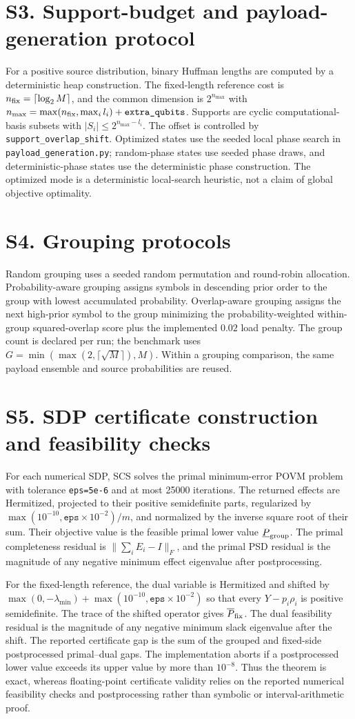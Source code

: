 \documentclass[10pt]{article}
\newcommand{\suppsection}[1]{\section*{#1}}
\begin{document}
\suppsection{S3. Support-budget and payload-generation protocol}
For a positive source distribution, binary Huffman lengths are computed by a deterministic heap construction. The fixed-length reference cost is $n_{\rm fix}=\lceil\log_2 M\rceil$, and the common dimension is $2^{n_{\max}}$ with $n_{\max}=\max(n_{\rm fix},\max_i l_i)+\texttt{extra\_qubits}$. Supports are cyclic computational-basis subsets with $|S_i|\le 2^{n_{\max}-l_i}$. The offset is controlled by \texttt{support\_overlap\_shift}. Optimized states use the seeded local phase search in \texttt{payload\_generation.py}; random-phase states use seeded phase draws, and deterministic-phase states use the deterministic phase construction. The optimized mode is a deterministic local-search heuristic, not a claim of global objective optimality.

\suppsection{S4. Grouping protocols}
Random grouping uses a seeded random permutation and round-robin allocation. Probability-aware grouping assigns symbols in descending prior order to the group with lowest accumulated probability. Overlap-aware grouping assigns the next high-prior symbol to the group minimizing the probability-weighted within-group squared-overlap score plus the implemented $0.02$ load penalty. The group count is declared per run; the benchmark uses $G=\min(\max(2,\lceil\sqrt M\rceil),M)$. Within a grouping comparison, the same payload ensemble and source probabilities are reused.

\suppsection{S5. SDP certificate construction and feasibility checks}
For each numerical SDP, SCS solves the primal minimum-error POVM problem with tolerance \texttt{eps=5e-6} and at most 25000 iterations. The returned effects are Hermitized, projected to their positive semidefinite parts, regularized by $\max(10^{-10},\texttt{eps}\times10^{-2})/m$, and normalized by the inverse square root of their sum. Their objective value is the feasible primal lower value $\underline P_{\rm group}$. The primal completeness residual is $\|\sum_iE_i-I\|_F$, and the primal PSD residual is the magnitude of any negative minimum effect eigenvalue after postprocessing.

For the fixed-length reference, the dual variable is Hermitized and shifted by $\max(0,-\lambda_{\min})+\max(10^{-10},\texttt{eps}\times10^{-2})$ so that every $Y-p_i\rho_i$ is positive semidefinite. The trace of the shifted operator gives $\overline P_{\rm fix}$. The dual feasibility residual is the magnitude of any negative minimum slack eigenvalue after the shift. The reported certificate gap is the sum of the grouped and fixed-side postprocessed primal--dual gaps. The implementation aborts if a postprocessed lower value exceeds its upper value by more than $10^{-8}$. Thus the theorem is exact, whereas floating-point certificate validity relies on the reported numerical feasibility checks and postprocessing rather than symbolic or interval-arithmetic proof.
\end{document}
